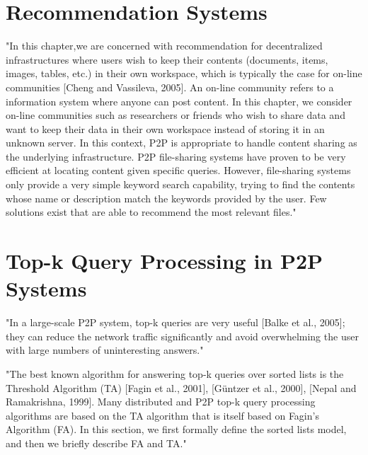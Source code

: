 \section{Recommendation Systems}

"In this chapter,we are concerned with recommendation for decentralized infrastructures where users wish to keep their contents (documents, items, images, tables, etc.) in their own workspace, which is typically the case for on-line communities [Cheng and Vassileva, 2005].
An on-line community refers to a information system where anyone can post content.
In this chapter, we consider on-line communities such as researchers or friends who wish to share data and want to keep their data in their own workspace instead of storing it in an unknown server.
In this context, P2P is appropriate to handle content sharing as the underlying infrastructure.
P2P file-sharing systems have proven to be very efficient at locating content given specific queries.
However, file-sharing systems only provide a very simple keyword search capability, trying to find the contents whose name or description match the keywords provided by the user.
Few solutions exist that are able to recommend the most relevant files."\cite{book:p2p-mob}

\section{Top-k Query Processing in P2P Systems}

"In a large-scale P2P system, top-k queries are very useful [Balke et al., 2005]; they can reduce the network traffic significantly and avoid overwhelming the user with large numbers of uninteresting answers."\cite{book:p2p-mob}

"The best known algorithm for answering top-k queries over sorted lists is the Threshold Algorithm (TA) [Fagin et al., 2001], [Güntzer et al., 2000], [Nepal and Ramakrishna, 1999].
Many distributed and P2P top-k query processing algorithms are based on the TA algorithm that is itself based on Fagin’s Algorithm (FA).
In this section, we first formally define the sorted lists model, and then we briefly describe FA and TA."\cite{book:p2p-mob}